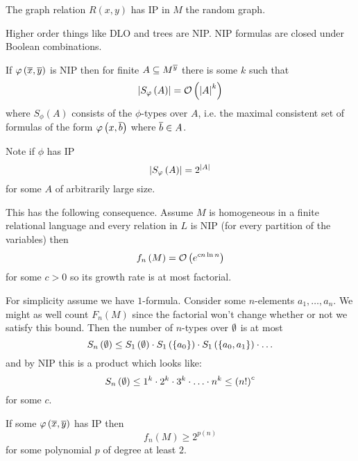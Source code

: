 \documentclass{amsart}
\begin{document}
\begin{exm}
The graph relation $R\left(x , y\right)$ has IP
in $M$ the random graph. 
\end{exm}

\begin{exm}
Higher order things like DLO and trees are NIP. 
NIP formulas are closed under Boolean combinations. 
\end{exm}

\begin{lem}
If $\varphi\left(\overline{x}, \overline{y}\right)$ is NIP then for finite $A\subseteq M^{\overline{y}}$
there is some $k$ such that
\begin{equation}
\left| S_\varphi\left(A\right) \right| = \mathcal{O}\left(\left| A \right|^k\right)
\end{equation}
where $S_\phi\left(A\right)$ consists of the $\phi$-types over $A$, i.e. the maximal
consistent set of formulas of the form
$\varphi\left(x , \overline{b}\right)$ where $\overline{b}\in A$.
\end{lem}

Note if $\phi$ has IP
\begin{equation}
\left| S_\varphi\left(A\right) \right| = 2^{\left| A \right|}
\end{equation}
for some $A$ of arbitrarily large size.

This has the following consequence. Assume $M$ is homogeneous in a finite relational
language and every relation in $L$ is NIP (for every partition of the variables) then
\begin{equation}
f_n\left(M\right) = \mathcal{O}\left(e^{cn\ln n}\right)
\end{equation}
for some $c > 0$ so its growth rate is at most factorial.

For simplicity assume we have $1$-formula. Consider some $n$-elements $a_1 , \ldots , a_n$.
We might as well count $F_n\left(M\right)$ since the factorial won't change whether or not
we satisfy this bound. 
Then the number of $n$-types over $\emptyset$ is at most
\begin{equation}
S_n\left(\emptyset\right)\leq S_1\left(\emptyset\right)
\cdot S_1\left(\left\{a_0\right\}\right) \cdot S_1\left(\left\{a_0 , a_1\right\}\right)
\cdot \ldots
\end{equation}
and by NIP this is a product which looks like:
\begin{equation}
S_n\left(\emptyset\right) \leq 1^k \cdot 2^k \cdot 3^k \cdot \ldots \cdot n^k \leq \left(n!\right)^c
\end{equation}
for some $c$.

\begin{fact}[Macpherson]
If some $\varphi\left(\overline{x} , \overline{y}\right)$ has IP then 
\begin{equation}
f_n\left(M\right) \geq 2^{p\left(n\right)}
\end{equation}
for some polynomial $p$ of degree at least $2$.
\end{fact}
\end{document}
